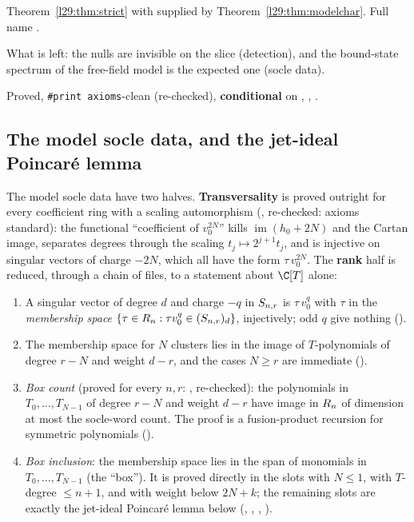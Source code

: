 \begin{dictionary}
Theorem~\ref{l29:thm:strict} with  supplied by Theorem~\ref{l29:thm:modelchar}. Full name
.
\end{dictionary}

\begin{physics}
What is left: the nulls are invisible on the slice (detection), and the bound-state spectrum of the free-field model
is the expected one (socle data).
\end{physics}

\begin{status}
Proved, \texttt{\#print axioms}-clean (re-checked), \textbf{conditional} on , , .
\end{status}

\subsection{The model socle data, and the jet-ideal Poincar\'e lemma}\label{l29:sec:poincare}

The model socle data have two halves. \textbf{Transversality} is proved outright for every coefficient ring with a
scaling automorphism (, re-checked: axioms standard): the functional ``coefficient of $v_0^{2N}$''
kills $\operatorname{im}(h_0+2N)$ and the Cartan image, separates degrees through the scaling $t_j\mapsto2^{j+1}t_j$, and
is injective on singular vectors of charge $-2N$, which all have the form $\tau\,v_0^{2N}$. The \textbf{rank} half is
reduced, through a chain of files, to a statement about $\C[T]$ alone:
\begin{enumerate}
\item A singular vector of degree $d$ and charge $-q$ in $S_{n,r}$ is $\tau\,v_0^{q}$ with $\tau$ in the
  \emph{membership space} $\{\tau\in R_n:\tau v_0^q\in(S_{n,r})_d\}$, injectively; odd $q$ give nothing
  ().
\item The membership space for $N$ clusters lies in the image of $T$-polynomials of degree $r-N$ and weight $d-r$, and the
  cases $N\ge r$ are immediate ().
\item \emph{Box count} (proved for every $n,r$: , re-checked): the polynomials in $T_0,\dots,T_{N-1}$
  of degree $r-N$ and weight $d-r$ have image in $R_n$ of dimension at most the socle-word count. The proof
  is a fusion-product recursion for symmetric polynomials ().
\item \emph{Box inclusion}: the membership space lies in the span of monomials in $T_0,\dots,T_{N-1}$ (the ``box''). It is
  proved directly in the slots with $N\le1$, with $T$-degree $\le n+1$, and with weight below $2N+k$; the remaining
  slots are exactly the jet-ideal Poincar\'e lemma below (, ,
  , ).
\end{enumerate}

